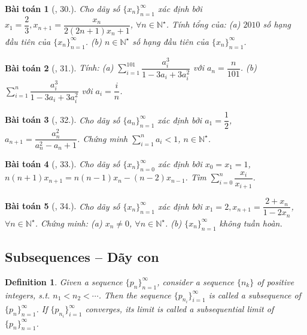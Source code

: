 \documentclass{article}
\newtheorem{baitoan}{Bài toán}
\newtheorem{definition}{Definition}
\begin{document}
\begin{baitoan}[\cite{TLCT_dai_so_giai_tich_11}, 30.]
	Cho dãy số $\{x_n\}_{n=1}^\infty$ xác định bởi $x_1 = \dfrac{2}{3},x_{n+1} = \dfrac{x_n}{2(2n + 1)x_n + 1}$, $\forall n\in\mathbb{N}^\star$. Tính tổng của: (a) $2010$ số hạng đầu tiên của $\{x_n\}_{n=1}^\infty$. (b) $n\in\mathbb{N}^\star$ số hạng đầu tiên của $\{x_n\}_{n=1}^\infty$.
\end{baitoan}

\begin{baitoan}[\cite{TLCT_dai_so_giai_tich_11}, 31.]
	Tính: (a) $\sum_{i=1}^{101} \dfrac{a_i^3}{1 - 3a_i + 3a_i^2}$ với $a_n = \dfrac{n}{101}$. (b) $\sum_{i=1}^n \dfrac{a_i^3}{1 - 3a_i + 3a_i^2}$ với $a_i = \dfrac{i}{n}$.
\end{baitoan}

\begin{baitoan}[\cite{TLCT_dai_so_giai_tich_11}, 32.]
	Cho dãy số $\{a_n\}_{n=1}^\infty$ xác định bởi $a_1 = \dfrac{1}{2}$, $a_{n+1} = \dfrac{a_n^2}{a_n^2 - a_n + 1}$. Chứng minh $\sum_{i=1}^n a_i < 1$, $n\in\mathbb{N}^\star$.
\end{baitoan}

\begin{baitoan}[\cite{TLCT_dai_so_giai_tich_11}, 33.]
	Cho dãy số $\{x_n\}_{n=0}^\infty$ xác định bởi $x_0 = x_1 = 1$,$n(n + 1)x_{n+1} = n(n - 1)x_n - (n - 2)x_{n-1}$. Tìm $\sum_{i=0}^n \dfrac{x_i}{x_{i+1}}$.
\end{baitoan}

\begin{baitoan}[\cite{TLCT_dai_so_giai_tich_11}, 34.]
	Cho dãy số $\{x_n\}_{n=1}^\infty$ xác định bởi $x_1 = 2,x_{n+1} = \dfrac{2 + x_n}{1 - 2x_n}$, $\forall n\in\mathbb{N}^\star$. Chứng minh: (a) $x_n\ne0$, $\forall n\in\mathbb{N}^\star$. (b) $\{x_n\}_{n=1}^\infty$ không tuần hoàn.
\end{baitoan}


\subsection{Subsequences -- Dãy con}

\begin{definition}
	Given a sequence $\{p_n\}_{n=1}^\infty$, consider a sequence $\{n_k\}$ of positive integers, s.t. $n_1 < n_2 < \cdots$. Then the sequence $\{p_{n_i}\}_{i=1}^\infty$ is called a {\rm subsequence} of $\{p_n\}_{n=1}^\infty$. If $\{p_{n_i}\}_{i=1}^\infty$ converges, its limit is called a {\rm subsequential limit} of $\{p_n\}_{n=1}^\infty$.
\end{definition}
\end{document}
